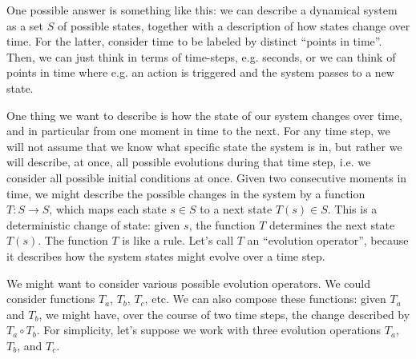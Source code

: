 One possible answer is something like this: we can describe a dynamical system as a set $S$ of possible states, together with a description of how states change over time. For the latter, consider time to be labeled by distinct ``points in time''. Then, we can just think in terms of time-steps, e.g. seconds, or we can think of points in time where e.g. an action is triggered and the system passes to a new state. 

One thing we want to describe is how the state of our system changes over time, and in particular from one moment in time to the next. For any time step, we will not assume that we know what specific state the system is in, but rather we will describe, at once, all possible evolutions during that time step, i.e. we consider all possible initial conditions at once. Given two consecutive moments in time, we might describe the possible changes in the system by a function $T : S \rightarrow S$, which maps each state $s \in S$ to a next state $T(s) \in S$. This is a deterministic change of state: given $s$, the function $T$ determines the next state $T(s)$. The function $T$ is like a rule. Let's call $T$ an ``evolution operator'', because it describes how the system states might evolve over a time step. 

We might want to consider various possible evolution operators. We could consider functions $T_a$, $T_b$, $T_c$, etc. We can also compose these functions: given $T_a$ and $T_b$, we might have, over the course of two time steps, the change described by $T_a \circ T_b$. For simplicity, let's suppose we work with three evolution operations $T_a$, $T_b$, and $T_c$.

\


\








